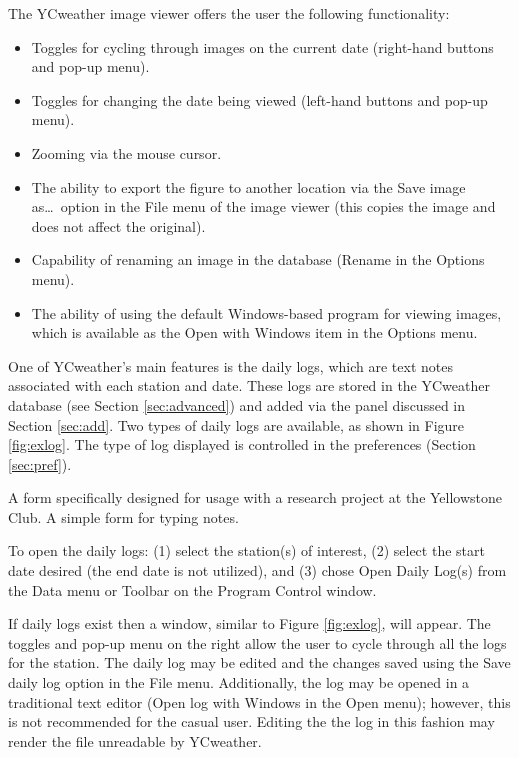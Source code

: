 The YCweather image viewer offers the user the following functionality:
\begin{itemize}
     \item Toggles for cycling through images on the current date (right-hand buttons and pop-up menu).
     \item Toggles for changing the date being viewed (left-hand buttons and pop-up menu).
     \item Zooming via the mouse cursor.
     \item The ability to export the figure to another location via the Save image as\ldots ~option in the File menu of the image viewer (this copies the image and does not affect the original).
     \item Capability of renaming an image in the database (Rename in the Options menu).
     \item The ability of using the default Windows-based program for viewing images, which is available as the Open with Windows item in the Options menu. 
\end{itemize}

 \label{sec:dailylogs}
One of YCweather's main features is the daily logs, which are text notes associated with each station and date.  These logs are stored in the YCweather database (see Section \ref{sec:advanced}) and added via the panel discussed in Section \ref{sec:add}.  Two types of daily logs are available, as shown in Figure \ref{fig:exlog}.  The type of log displayed is controlled in the preferences (Section \ref{sec:pref}).
\begin{enumerate}
	 A form specifically designed for usage with a research project at the Yellowstone Club.
	 A simple form for typing notes.
\end{enumerate}

To open the daily logs: (1) select the station(s) of interest, (2) select the start date desired (the end date is not utilized), and
(3) chose Open Daily Log(s) from the Data menu or Toolbar on the Program Control window.

If daily logs exist then a window, similar to Figure \ref{fig:exlog}, will appear.  The toggles and pop-up menu on the right allow the user to cycle through all the logs for the station.   The daily log may be edited and the changes saved using the Save daily log option in the File menu. Additionally, the log may be opened in a traditional text editor (Open log with Windows in the Open menu); however, this is not recommended for the casual user. Editing the the log in this fashion may render the file unreadable by YCweather.  

